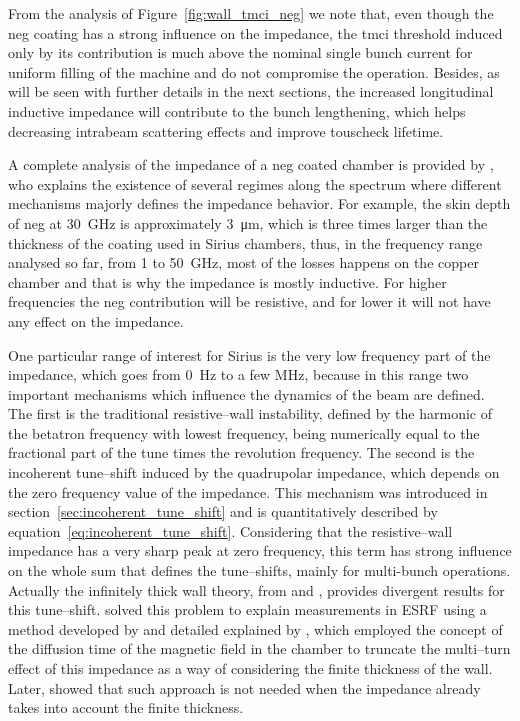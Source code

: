     From the analysis of Figure~\ref{fig:wall_tmci_neg} we note that, even though the \gls{neg} coating has a strong influence on the impedance, the \gls{tmci} threshold induced only by its contribution is much above the nominal single bunch current for uniform filling of the machine and do not compromise the operation. Besides, as will be seen with further details in the next sections, the increased longitudinal inductive impedance will contribute to the bunch lengthening, which helps decreasing intrabeam scattering effects and improve touscheck lifetime.

    A complete analysis of the impedance of a \gls{neg} coated chamber is provided by , who explains the existence of several regimes along the spectrum where different mechanisms majorly defines the impedance behavior. For example, the skin depth of \gls{neg} at \SI{30}{\giga\hertz} is approximately \SI{3}{\micro\meter}, which is three times larger than the thickness of the coating used in Sirius chambers, thus, in the frequency range analysed so far, from \SI{1}{} to \SI{50}{\giga\hertz}, most of the losses happens on the copper chamber and that is why the impedance is mostly inductive. For higher frequencies the \gls{neg} contribution will be resistive, and for lower it will not have any effect on the impedance.

    One particular range of interest for Sirius is the very low frequency part of the impedance, which goes from \SI{0}{\hertz} to a few \si{\mega\hertz}, because in this range two important mechanisms which influence the dynamics of the beam are defined. The first is the traditional resistive--wall instability, defined by the harmonic of the betatron frequency with lowest frequency, being numerically equal to the fractional part of the tune times the revolution frequency. The second is the incoherent tune--shift induced by the quadrupolar impedance, which depends on the zero frequency value of the impedance. This mechanism was introduced in section~\ref{sec:incoherent_tune_shift} and is quantitatively described by equation~\eqref{eq:incoherent_tune_shift}. Considering that the resistive--wall impedance has a very sharp peak at zero frequency, this term has strong influence on the whole sum that defines the tune--shifts, mainly for multi-bunch operations. Actually the infinitely thick wall theory, from  and , provides divergent results for this tune--shift.  solved this problem to explain measurements in ESRF using a method developed by  and detailed explained by , which employed the concept of the diffusion time of the magnetic field in the chamber to truncate the multi--turn effect of this impedance as a way of considering the finite thickness of the wall. Later,  showed that such approach is not needed when the impedance already takes into account the finite thickness.

